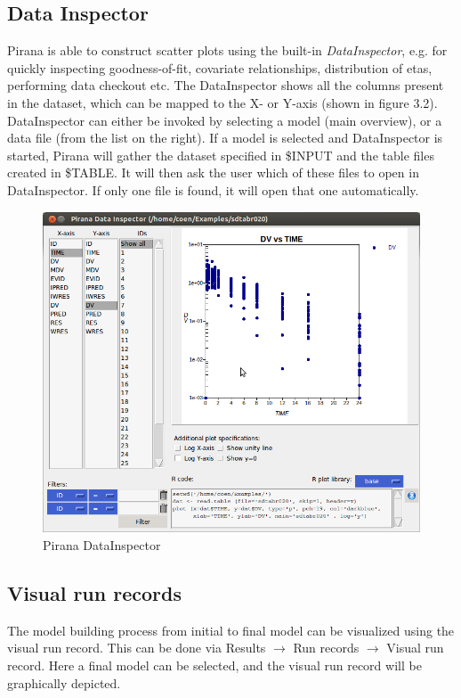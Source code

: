 {{{{\subsection{Data Inspector} Pirana is able to construct scatter plots
using the built-in \textit{DataInspector}, e.g. for quickly inspecting
goodness-of-fit, covariate relationships, distribution of etas,
performing data checkout etc. The DataInspector shows all the columns
present in the dataset, which can be mapped to the X- or Y-axis
(shown in figure 3.2). DataInspector can either be invoked by
selecting a model (main overview), or a data file (from the list on
the right). If a model is selected and DataInspector is started,
Pirana will gather the dataset specified in \$INPUT and the table
files created in \$TABLE. It will then ask the user which of these
files to open in DataInspector. If only one file is found, it will
open that one automatically.

\begin{figure}[H] \centering
    \includegraphics[scale=0.35]{images/plot.png}
    \caption{Pirana DataInspector}
\end{figure}


  \subsection{Visual run records}
The model building process from initial to final model can be visualized using the visual run record.
This can be done via Results  $\rightarrow$ Run records $\rightarrow$ Visual run record.
Here a final model can be selected, and the visual run record will be graphically depicted.

}}}}

